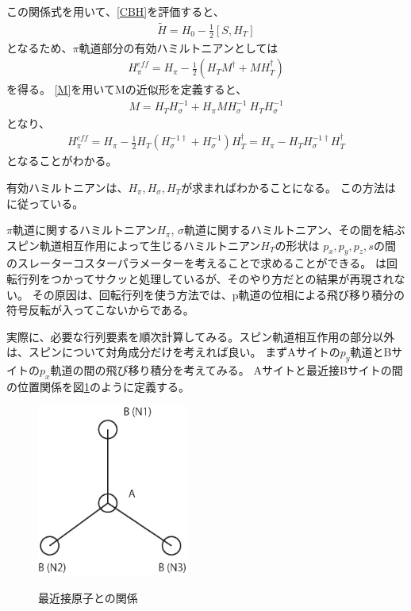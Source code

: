 \documentclass{article}
\begin{document}
この関係式を用いて、\ref{CBH}を評価すると、
\begin{eqnarray}
\tilde{H}=H_0-\frac{1}{2}[S, H_T]
\end{eqnarray}
となるため、$\pi$軌道部分の有効ハミルトニアンとしては
\begin{eqnarray}
H_\pi^{eff}=H_\pi-\frac{1}{2}(H_TM^\dagger+MH_T^\dagger)
\end{eqnarray}
を得る。
\ref{M}を用いてMの近似形を定義すると、
\begin{eqnarray}
M=H_TH_\sigma^{-1}+H_\pi MH_\sigma^{-1}~H_TH_\sigma^{-1}
\end{eqnarray}
となり、
\begin{eqnarray}
H_\pi^{eff}=H_\pi-\frac{1}{2}H_T(H_\sigma^{-1\dagger}+H_\sigma^{-1})H_T^\dagger=H_\pi-H_T
H_\sigma^{-1\dagger}H_T^\dagger
\end{eqnarray}
となることがわかる。

有効ハミルトニアンは、$H_\pi, H_\sigma, H_T$が求まればわかることになる。
この方法は\cite{Yao}に従っている。

$\pi$軌道に関するハミルトニアン$H_\pi$,
$\sigma$軌道に関するハミルトニアン、その間を結ぶスピン軌道相互作用によって生じるハミルトニアン$H_T$の形状は $p_x,p_y,
p_z,s$の間のスレーターコスターパラメーターを考えることで求めることができる。
\cite{Yao}は回転行列をつかってサクッと処理しているが、そのやり方だと\cite{Hongki}の結果が再現されない。
その原因は、回転行列を使う方法では、p軌道の位相による飛び移り積分の符号反転が入ってこないからである。

実際に、必要な行列要素を順次計算してみる。スピン軌道相互作用の部分以外は、スピンについて対角成分だけを考えれば良い。
まずAサイトの$p_y$軌道とBサイトの$p_x$軌道の間の飛び移り積分を考えてみる。
Aサイトと最近接Bサイトの間の位置関係を図\ref{NN}のように定義する。
\begin{figure}[hbtp]
\centering
\includegraphics[width=5cm]{nearestNeighbor.eps}
\label{NN}
\caption{最近接原子との関係}
\end{figure}
\end{document}
